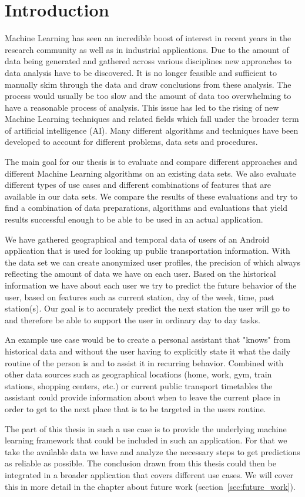 \newpage
\section{Introduction}

Machine Learning has seen an incredible boost of interest in recent years in the research community as well as in industrial applications. Due to the amount of data being generated and gathered across various disciplines new approaches to data analysis have to be discovered. It is no longer feasible and sufficient to manually skim through the data and draw conclusions from these analysis. The process would usually be too slow and the amount of data too overwhelming to have a reasonable process of analysis. This issue has led to the rising of new Machine Learning techniques and related fields which fall under the broader term of artificial intelligence (AI). Many different algorithms and techniques have been developed to account for different problems, data sets and procedures.

The main goal for our thesis is to evaluate and compare different approaches and different Machine Learning algorithms on an existing data sets. We also evaluate different types of use cases and different combinations of features that are available in our data sets. We compare the results of these evaluations and try to find a combination of data preparations, algorithms and evaluations that yield results successful enough to be able to be used in an actual application. 

We have gathered geographical and temporal data of users of an Android application that is used for looking up public transportation information. With the data set we can create anonymized user profiles, the precision of which always reflecting the amount of data we have on each user. Based on the historical information we have about each user we try to predict the future behavior of the user, based on features such as current station, day of the week, time, past station(s). Our goal is to accurately predict the next station the user will go to and therefore be able to support the user in ordinary day to day tasks. 

An example use case would be to create a personal assistant that "knows" from historical data and without the user having to explicitly state it what the daily routine of the person is and to assist it in recurring behavior. Combined with other data sources such as geographical locations (home, work, gym, train stations, shopping centers, etc.) or current public transport timetables the assistant could provide information about when to leave the current place in order to get to the next place that is to be targeted in the users routine. 

The part of this thesis in such a use case is to provide the underlying machine learning framework that could be included in such an application. For that we take the available data we have and analyze the necessary steps to get predictions as reliable as possible. The conclusion drawn from this thesis could then be integrated in a broader application that covers different use cases. We will cover this in more detail in the chapter about future work (section~\ref{sec:future_work}).
